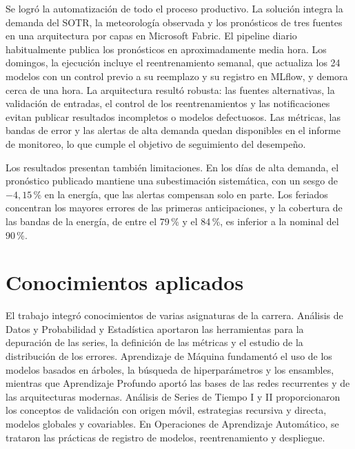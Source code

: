 Se logró la automatización de todo el proceso productivo. La solución integra la demanda del SOTR, la meteorología observada y los pronósticos de tres fuentes en una arquitectura por capas en Microsoft Fabric. El pipeline diario habitualmente publica los pronósticos en aproximadamente media hora. Los domingos, la ejecución incluye el reentrenamiento semanal, que actualiza los 24 modelos con un control previo a su reemplazo y su registro en MLflow, y demora cerca de una hora. La arquitectura resultó robusta: las fuentes alternativas, la validación de entradas, el control de los reentrenamientos y las notificaciones evitan publicar resultados incompletos o modelos defectuosos. Las métricas, las bandas de error y las alertas de alta demanda quedan disponibles en el informe de monitoreo, lo que cumple el objetivo de seguimiento del desempeño.

Los resultados presentan también limitaciones. En los días de alta demanda, el pronóstico publicado mantiene una subestimación sistemática, con un sesgo de $-4{,}15$\,\% en la energía, que las alertas compensan solo en parte. Los feriados concentran los mayores errores de las primeras anticipaciones, y la cobertura de las bandas de la energía, de entre el 79\,\% y el 84\,\%, es inferior a la nominal del 90\,\%. 

\section{Conocimientos aplicados}
\label{sec:conocimientos}

El trabajo integró conocimientos de varias asignaturas de la carrera. Análisis de Datos y Probabilidad y Estadística aportaron las herramientas para la depuración de las series, la definición de las métricas y el estudio de la distribución de los errores. Aprendizaje de Máquina fundamentó el uso de los modelos basados en árboles, la búsqueda de hiperparámetros y los ensambles, mientras que Aprendizaje Profundo aportó las bases de las redes recurrentes y de las arquitecturas modernas. Análisis de Series de Tiempo I y II proporcionaron los conceptos de validación con origen móvil, estrategias recursiva y directa, modelos globales y covariables. En Operaciones de Aprendizaje Automático, se trataron las prácticas de registro de modelos, reentrenamiento y despliegue. 

